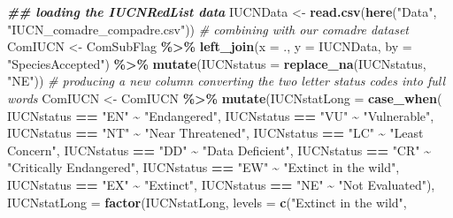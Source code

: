 \documentclass[
]{article}
\newenvironment{Shaded}{\begin{snugshade}}{\end{snugshade}}
\newcommand{\AttributeTok}[1]{\textcolor[rgb]{0.13,0.29,0.53}{#1}}
\newcommand{\CommentTok}[1]{\textcolor[rgb]{0.56,0.35,0.01}{\textit{#1}}}
\newcommand{\DocumentationTok}[1]{\textcolor[rgb]{0.56,0.35,0.01}{\textbf{\textit{#1}}}}
\newcommand{\FunctionTok}[1]{\textcolor[rgb]{0.13,0.29,0.53}{\textbf{#1}}}
\newcommand{\NormalTok}[1]{#1}
\newcommand{\OtherTok}[1]{\textcolor[rgb]{0.56,0.35,0.01}{#1}}
\newcommand{\SpecialCharTok}[1]{\textcolor[rgb]{0.81,0.36,0.00}{\textbf{#1}}}
\newcommand{\StringTok}[1]{\textcolor[rgb]{0.31,0.60,0.02}{#1}}
\begin{document}
\begin{Shaded}
\begin{Highlighting}[]
\DocumentationTok{\#\# loading the IUCNRedList data}
\NormalTok{IUCNData }\OtherTok{\textless{}{-}} \FunctionTok{read.csv}\NormalTok{(}\FunctionTok{here}\NormalTok{(}\StringTok{"Data"}\NormalTok{, }\StringTok{"IUCN\_comadre\_compadre.csv"}\NormalTok{))}
\CommentTok{\# combining with our comadre dataset}
\NormalTok{ComIUCN }\OtherTok{\textless{}{-}}\NormalTok{ ComSubFlag }\SpecialCharTok{\%\textgreater{}\%}
  \FunctionTok{left\_join}\NormalTok{(}\AttributeTok{x =}\NormalTok{ ., }\AttributeTok{y =}\NormalTok{ IUCNData, }\AttributeTok{by =} \StringTok{"SpeciesAccepted"}\NormalTok{) }\SpecialCharTok{\%\textgreater{}\%} 
  \FunctionTok{mutate}\NormalTok{(}\AttributeTok{IUCNstatus =} \FunctionTok{replace\_na}\NormalTok{(IUCNstatus, }\StringTok{"NE"}\NormalTok{))}
\CommentTok{\# producing a new column converting the two letter status codes into full words}
\NormalTok{ComIUCN }\OtherTok{\textless{}{-}}\NormalTok{ ComIUCN }\SpecialCharTok{\%\textgreater{}\%} 
  \FunctionTok{mutate}\NormalTok{(}\AttributeTok{IUCNstatLong =} \FunctionTok{case\_when}\NormalTok{(}
\NormalTok{    IUCNstatus }\SpecialCharTok{==} \StringTok{"EN"} \SpecialCharTok{\textasciitilde{}} \StringTok{"Endangered"}\NormalTok{,}
\NormalTok{    IUCNstatus }\SpecialCharTok{==} \StringTok{"VU"} \SpecialCharTok{\textasciitilde{}} \StringTok{"Vulnerable"}\NormalTok{,}
\NormalTok{    IUCNstatus }\SpecialCharTok{==} \StringTok{"NT"} \SpecialCharTok{\textasciitilde{}} \StringTok{"Near Threatened"}\NormalTok{,}
\NormalTok{    IUCNstatus }\SpecialCharTok{==} \StringTok{"LC"} \SpecialCharTok{\textasciitilde{}} \StringTok{"Least Concern"}\NormalTok{,}
\NormalTok{    IUCNstatus }\SpecialCharTok{==} \StringTok{"DD"} \SpecialCharTok{\textasciitilde{}} \StringTok{"Data Deficient"}\NormalTok{,}
\NormalTok{    IUCNstatus }\SpecialCharTok{==} \StringTok{"CR"} \SpecialCharTok{\textasciitilde{}} \StringTok{"Critically Endangered"}\NormalTok{,}
\NormalTok{    IUCNstatus }\SpecialCharTok{==} \StringTok{"EW"} \SpecialCharTok{\textasciitilde{}} \StringTok{"Extinct in the wild"}\NormalTok{,}
\NormalTok{    IUCNstatus }\SpecialCharTok{==} \StringTok{"EX"} \SpecialCharTok{\textasciitilde{}} \StringTok{"Extinct"}\NormalTok{,}
\NormalTok{    IUCNstatus }\SpecialCharTok{==} \StringTok{"NE"} \SpecialCharTok{\textasciitilde{}} \StringTok{"Not Evaluated"}\NormalTok{),}
    \AttributeTok{IUCNstatLong =} \FunctionTok{factor}\NormalTok{(IUCNstatLong, }
                        \AttributeTok{levels =} \FunctionTok{c}\NormalTok{(}\StringTok{"Extinct in the wild"}\NormalTok{,}

\end{Highlighting}
\end{Shaded}
\end{document}
